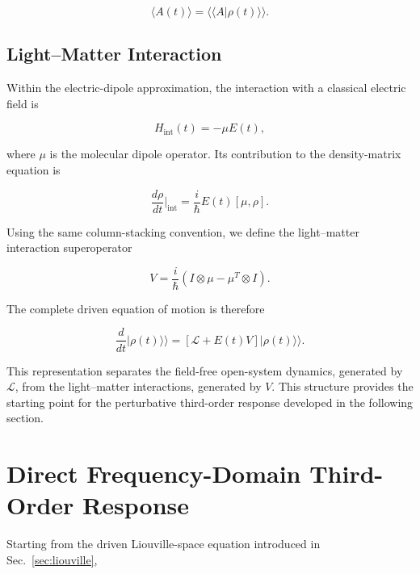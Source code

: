 \documentclass[11pt]{article}
\begin{document}
\begin{equation}
\langle A(t)\rangle
=
\langle\!\langle A|\rho(t)\rangle\!\rangle.
\end{equation}


\subsection{Light--Matter Interaction}

Within the electric-dipole approximation, the interaction with a
classical electric field is

\begin{equation}
H_{\mathrm{int}}(t)
=
-\mu E(t),
\label{eq:hint}
\end{equation}

where $\mu$ is the molecular dipole operator. Its contribution to the
density-matrix equation is

\begin{equation}
\frac{d\rho}{dt}\bigg|_{\mathrm{int}}
=
\frac{i}{\hbar}
E(t)[\mu,\rho].
\end{equation}

Using the same column-stacking convention, we define the
light--matter interaction superoperator

\begin{equation}
\boxed{
V
=
\frac{i}{\hbar}
\left(
I\otimes\mu
-
\mu^{T}\otimes I
\right).
}
\label{eq:interaction_superoperator}
\end{equation}

The complete driven equation of motion is therefore

\begin{equation}
\boxed{
\frac{d}{dt}
|\rho(t)\rangle\rangle
=
\left[
\mathcal{L}
+
E(t)V
\right]
|\rho(t)\rangle\rangle.
}
\label{eq:driven_liouville}
\end{equation}

This representation separates the field-free open-system dynamics,
generated by $\mathcal{L}$, from the light--matter interactions,
generated by $V$. This structure provides the starting point for the
perturbative third-order response developed in the following section.
\section{Direct Frequency-Domain Third-Order Response}
\label{sec:frequency_response}

Starting from the driven Liouville-space equation introduced in
Sec.~\ref{sec:liouville},
\end{document}
